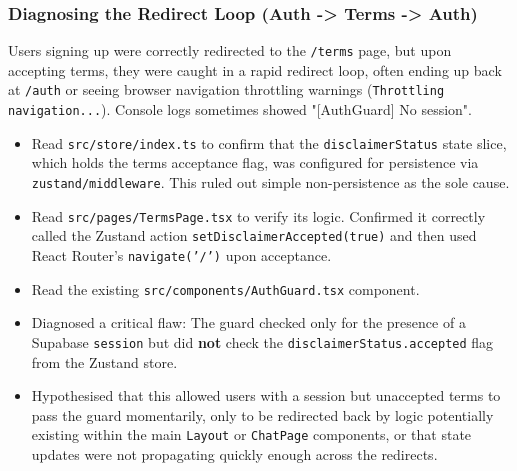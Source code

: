 \documentclass[11pt]{article} %
\begin{document}
\subsubsection{Diagnosing the Redirect Loop (Auth -> Terms -> Auth)}
\begin{description}[style=unboxed,leftmargin=0pt]
    \item[Problem:] Users signing up were correctly redirected to the \texttt{/terms} page, but upon accepting terms, they were caught in a rapid redirect loop, often ending up back at \texttt{/auth} or seeing browser navigation throttling warnings (\texttt{Throttling navigation...}). Console logs sometimes showed "[AuthGuard] No session".
    \item[AI Assistance (Initial Checks):]
        \begin{itemize}
            \item Read \texttt{src/store/index.ts} to confirm that the \texttt{disclaimerStatus} state slice, which holds the terms acceptance flag, was configured for persistence via \texttt{zustand/middleware}. This ruled out simple non-persistence as the sole cause.
            \item Read \texttt{src/pages/TermsPage.tsx} to verify its logic. Confirmed it correctly called the Zustand action \texttt{setDisclaimerAccepted(true)} and then used React Router's \texttt{navigate('/')} upon acceptance.
        \end{itemize}
    \item[AI Assistance (AuthGuard Analysis):]
        \begin{itemize}
            \item Read the existing \texttt{src/components/AuthGuard.tsx} component.
            \item Diagnosed a critical flaw: The guard checked only for the presence of a Supabase \texttt{session} but did \textbf{not} check the \texttt{disclaimerStatus.accepted} flag from the Zustand store.
            \item Hypothesised that this allowed users with a session but unaccepted terms to pass the guard momentarily, only to be redirected back by logic potentially existing within the main \texttt{Layout} or \texttt{ChatPage} components, or that state updates were not propagating quickly enough across the redirects.
        \end{itemize}
\end{description}
\end{document}
